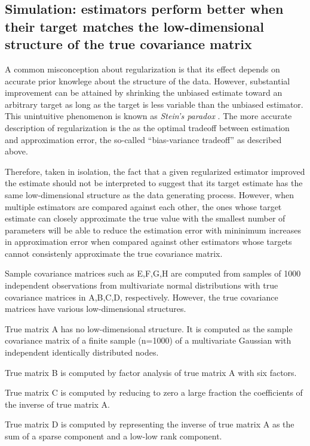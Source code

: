 \subsection*{Simulation: estimators perform better when their target matches the low-dimensional structure of the true covariance matrix}


A common misconception about regularization is that its effect depends on accurate prior knowlege about the structure of the data. However, substantial improvement can be attained by shrinking the unbiased estimate toward an arbitrary target as long as the target is less variable than the unbiased estimator.  This unintuitive phenomenon is known as \emph{Stein's paradox} \cite{Efron:1977}.  The more accurate description of regularization is the as the optimal tradeoff between estimation and approximation error, the so-called ``bias-variance tradeoff'' as described above.

Therefore, taken in isolation, the fact that a given regularized estimator improved the estimate should not be interpreted to suggest that its target estimate has the same low-dimensional structure as the data generating process.   However, when multiple estimators are compared against each other, the ones whose target estimate can closely approximate the true value with the smallest number of parameters will be able to reduce the estimation error with mininimum increases in approximation error when compared against other estimators whose targets cannot consistenly approximate the true covariance matrix.

Sample covariance matrices such as E,F,G,H are computed from samples of 1000 independent observations from multivariate normal distributions with true covariance matrices in A,B,C,D, respectively.  However, the true covariance matrices have various low-dimensional structures. 

True matrix A has no low-dimensional structure.  It is computed as the sample covariance matrix of a finite sample (n=1000) of a multivariate Gaussian with independent identically distributed nodes.  

True matrix B is computed by factor analysis of true matrix A with six factors.  

True matrix C is computed by reducing to zero a large fraction the coefficients of the inverse of true matrix A. 

True matrix D is computed by representing the inverse of true matrix A as the sum of a sparse component and a low-low rank component. 

